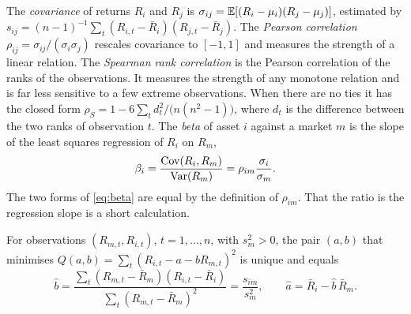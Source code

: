 \begin{chapterrefs}
The \emph{covariance} of returns $R_i$ and $R_j$ is $\sigma_{ij} = \mathbb{E}[(R_i-\mu_i)(R_j-\mu_j)]$, estimated
by $s_{ij} = (n-1)^{-1}\sum_t (R_{i,t}-\bar R_i)(R_{j,t}-\bar R_j)$. The \emph{Pearson correlation}
$\rho_{ij} = \sigma_{ij}/(\sigma_i\sigma_j)$ rescales covariance to $[-1,1]$ and measures the strength of
a linear relation. The \emph{Spearman rank correlation} \parencite{spearman1904} is the Pearson
correlation of the ranks of the observations. It measures the strength of any monotone relation and is
far less sensitive to a few extreme observations. When there are no ties it has the closed form
$\rho_S = 1 - 6\sum_t d_t^2/\bigl(n(n^2-1)\bigr)$, where $d_t$ is the difference between the two ranks of
observation $t$. The \emph{beta} of asset $i$ against a market $m$ is
the slope of the least squares regression of $R_i$ on $R_m$,
\begin{equation}\label{eq:beta}
  \beta_i = \frac{\operatorname{Cov}(R_i,R_m)}{\operatorname{Var}(R_m)} = \rho_{im}\frac{\sigma_i}{\sigma_m} .
\end{equation}
The two forms of \cref{eq:beta} are equal by the definition of $\rho_{im}$. That the ratio is the
regression slope is a short calculation.

\begin{proposition}\label{prop:ols}
For observations $(R_{m,t},R_{i,t})$, $t=1,\dots,n$, with $s_m^2>0$, the pair $(a,b)$ that minimises
$Q(a,b)=\sum_t (R_{i,t}-a-bR_{m,t})^2$ is unique and equals
\begin{equation}\label{eq:olsbeta}
  \hat b = \frac{\sum_t (R_{m,t}-\bar R_m)(R_{i,t}-\bar R_i)}{\sum_t (R_{m,t}-\bar R_m)^2} = \frac{s_{im}}{s_m^2},
  \qquad \hat a = \bar R_i - \hat b\,\bar R_m .
\end{equation}
\end{proposition}


\end{chapterrefs}

